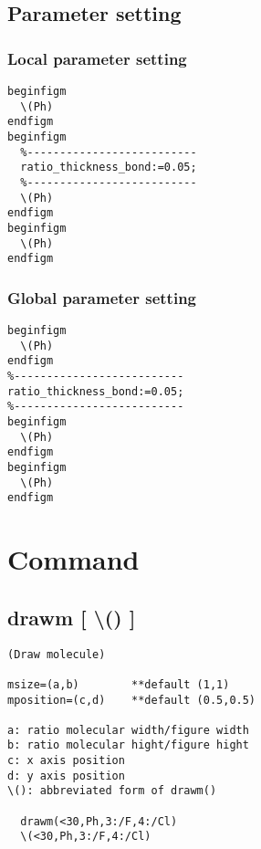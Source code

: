 \documentclass[a4paper]{article}
\begin{document}
\subsection{Parameter setting}
\subsubsection{Local parameter setting}
%
%
\begin{verbatim}
beginfigm
  \(Ph)
endfigm
beginfigm
  %--------------------------
  ratio_thickness_bond:=0.05;
  %--------------------------
  \(Ph)
endfigm
beginfigm
  \(Ph)
endfigm
\end{verbatim}
\quad
{}
\subsubsection{Global parameter setting}
\begin{verbatim}
beginfigm
  \(Ph)
endfigm
%--------------------------
ratio_thickness_bond:=0.05;
%--------------------------
beginfigm
  \(Ph)
endfigm
beginfigm
  \(Ph)
endfigm
\end{verbatim}
\quad
{}
\section{Command}
\subsection{drawm [ \textbackslash() ]}
%
\index{\textbackslash()}%
\begin{verbatim}
(Draw molecule)

msize=(a,b)        **default (1,1)
mposition=(c,d)    **default (0.5,0.5)

a: ratio molecular width/figure width
b: ratio molecular hight/figure hight
c: x axis position
d: y axis position
\(): abbreviated form of drawm()

  drawm(<30,Ph,3:/F,4:/Cl)
  \(<30,Ph,3:/F,4:/Cl)
\end{verbatim}
\end{document}

